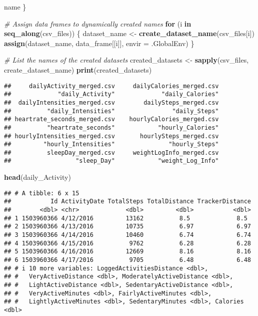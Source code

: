 \documentclass[
]{article}
\newenvironment{Shaded}{\begin{snugshade}}{\end{snugshade}}
\newcommand{\AttributeTok}[1]{\textcolor[rgb]{0.13,0.29,0.53}{#1}}
\newcommand{\CommentTok}[1]{\textcolor[rgb]{0.56,0.35,0.01}{\textit{#1}}}
\newcommand{\ControlFlowTok}[1]{\textcolor[rgb]{0.13,0.29,0.53}{\textbf{#1}}}
\newcommand{\FunctionTok}[1]{\textcolor[rgb]{0.13,0.29,0.53}{\textbf{#1}}}
\newcommand{\NormalTok}[1]{#1}
\newcommand{\OtherTok}[1]{\textcolor[rgb]{0.56,0.35,0.01}{#1}}
\begin{document}
\begin{Shaded}
\begin{Highlighting}[]
\NormalTok{  name}
\NormalTok{\}}

\CommentTok{\# Assign data frames to dynamically created names}
\ControlFlowTok{for}\NormalTok{ (i }\ControlFlowTok{in} \FunctionTok{seq\_along}\NormalTok{(csv\_files)) \{}
\NormalTok{  dataset\_name }\OtherTok{\textless{}{-}} \FunctionTok{create\_dataset\_name}\NormalTok{(csv\_files[i])}
  \FunctionTok{assign}\NormalTok{(dataset\_name, data\_frame[[i]], }\AttributeTok{envir =}\NormalTok{ .GlobalEnv)}
\NormalTok{\}}


\CommentTok{\# List the names of the created datasets}
\NormalTok{created\_datasets }\OtherTok{\textless{}{-}} \FunctionTok{sapply}\NormalTok{(csv\_files, create\_dataset\_name)}
\FunctionTok{print}\NormalTok{(created\_datasets)}
\end{Highlighting}
\end{Shaded}

\begin{verbatim}
##     dailyActivity_merged.csv     dailyCalories_merged.csv 
##             "daily_Activity"             "daily_Calories" 
##  dailyIntensities_merged.csv        dailySteps_merged.csv 
##          "daily_Intensities"                "daily_Steps" 
## heartrate_seconds_merged.csv    hourlyCalories_merged.csv 
##          "heartrate_seconds"            "hourly_Calories" 
## hourlyIntensities_merged.csv       hourlySteps_merged.csv 
##         "hourly_Intensities"               "hourly_Steps" 
##          sleepDay_merged.csv     weightLogInfo_merged.csv 
##                  "sleep_Day"            "weight_Log_Info"
\end{verbatim}

\begin{Shaded}
\begin{Highlighting}[]
\FunctionTok{head}\NormalTok{(daily\_Activity)}
\end{Highlighting}
\end{Shaded}

\begin{verbatim}
## # A tibble: 6 x 15
##           Id ActivityDate TotalSteps TotalDistance TrackerDistance
##        <dbl> <chr>             <dbl>         <dbl>           <dbl>
## 1 1503960366 4/12/2016         13162          8.5             8.5 
## 2 1503960366 4/13/2016         10735          6.97            6.97
## 3 1503960366 4/14/2016         10460          6.74            6.74
## 4 1503960366 4/15/2016          9762          6.28            6.28
## 5 1503960366 4/16/2016         12669          8.16            8.16
## 6 1503960366 4/17/2016          9705          6.48            6.48
## # i 10 more variables: LoggedActivitiesDistance <dbl>,
## #   VeryActiveDistance <dbl>, ModeratelyActiveDistance <dbl>,
## #   LightActiveDistance <dbl>, SedentaryActiveDistance <dbl>,
## #   VeryActiveMinutes <dbl>, FairlyActiveMinutes <dbl>,
## #   LightlyActiveMinutes <dbl>, SedentaryMinutes <dbl>, Calories <dbl>
\end{verbatim}
\end{document}
